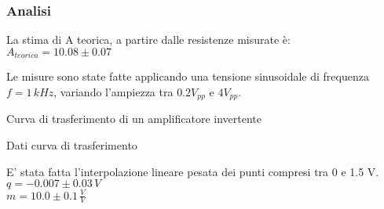 \subsubsection{Analisi}
La stima di A teorica, a partire dalle resistenze misurate è:\\
$A_{teorica}=10.08 \pm 0.07$ %

Le misure sono state fatte applicando una tensione sinusoidale di frequenza $ f=1 \,kHz$, variando l'ampiezza tra 
$0.2 V_{pp}$ e $4 V_{pp}$.

\begin{grafico} 
 \centering
 \resizebox{\textwidth}{!}{%
 
 }%
 \caption{Curva di trasferimento di un amplificatore invertente} 
 \label{gr:amp_noninv.tex} 
\end{grafico}

\begin{tabella}
 \centering
 
 \caption{Dati curva di trasferimento}
 \label{tab:tab_non_inv.tex}
\end{tabella}

E' stata fatta l'interpolazione lineare pesata dei punti compresi tra 0 e 1.5 V.\\
$q = -0.007 \pm 0.03 \, V$\\
$m = 10.0 \pm 0.1 \,\frac{V}{V}$

